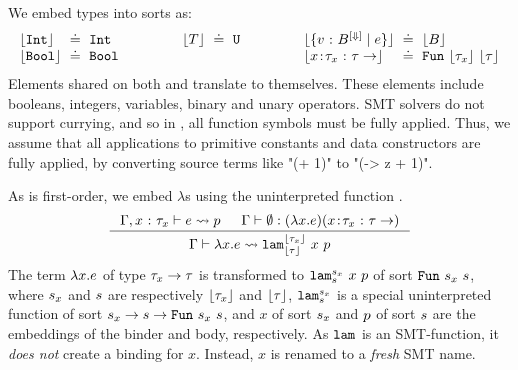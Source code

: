 %
We embed \corelan types into \smtlan sorts as:
%
$$\arraycolsep=1.4pt
\begin{array}{lclclclclcl}
\tosmt{\tint}   & \defeq &  \tint  & \qquad\qquad &
\tosmt{T}       & \defeq &  \tuniv & \qquad\qquad &
\tosmt{\tref{v}{\btyp^{[\tlabel]}}{e}} &\defeq & \tosmt{\btyp} \\
\tosmt{\tbool}  & \defeq &  \tbool & \quad\quad &
                &        &         & \quad\quad &
\tosmt{\trfun{x}{\typ_x}{\typ}} & \defeq & \tsmtfun{\tosmt{\typ_x}}{\tosmt{\typ}}
\end{array}$$
%
%
Elements shared on both \corelan and \smtlan
translate to themselves.
%
These elements include
booleans,
integers,
variables,
binary
and unary
operators.
%
SMT solvers do not support currying,
and so in \smtlan, all function symbols
must be fully applied.
%
Thus, we assume that all applications
to primitive constants and data
constructors are fully applied, \eg by converting
source terms like "(+ 1)" to
"(\z -> z + 1)".
%

%
As \smtlan is first-order, we
embed $\lambda$s using the
uninterpreted function \smtlamname{}{}.
%
$$
\inference{
    \tologicshort{\env, \tbind{x}{\typ_x}}{e}{}{\pred}{}{}{} &
        \hastype{\env}{\emptyset}{(\efun{x}{}{e})}{(\trfun{x}{\typ_x}{\typ})}\\
}{
	\tologicshort{\env}{\efun{x}{}{e}}{(\trfun{x}{\typ_x}{\typ})}
	        {\smtlamname{\tosmt{\typ_x}}{\tosmt{\typ}}\ {x}\ {\pred}}
	        {\sort'}{\smtenv, \tbind{f}{\sort'}}{\andaxioms{\{\axioms_{f_1}, \axioms_{f_2}\}}{\axioms}}
}%
$$
%
The term $\lambda x. e$ of type
${\tau_x \rightarrow \tau}$ is transformed
to
${\texttt{lam}^{s_x}_{s}\ x\ p}$
of sort
${\mathtt{Fun}\ {s_x}\ {s}}$, where
%
$s_x$ and $s$ are respectively
$\lfloor \tau_x\rfloor $ and $\lfloor \tau\rfloor $,
%
${\texttt{lam}^{s_x}_{s}}$
is a special uninterpreted function
of sort
${s_x \rightarrow s\rightarrow\mathtt{Fun}\ {s_x}\ {s}}$,
and
$x$ of sort $s_x$ and $p$ of sort $s$ are
the embeddings of the binder and body, respectively.
%
As $\texttt{lam}^{}_{}$ is an SMT-function,
it \emph{does not} create a binding for $x$.
%
Instead, $x$ is renamed to
a \emph{fresh} SMT name.


